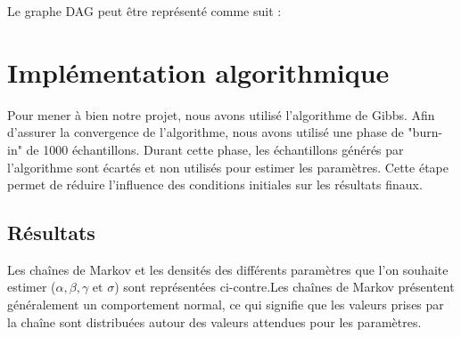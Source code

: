 \documentclass{rapportECN}
\begin{document}
Le graphe DAG peut être représenté comme suit : 
\begin{center}

\end{center}

\section*{Implémentation algorithmique}

 Pour mener à bien notre projet, nous avons utilisé l'algorithme de Gibbs. Afin d'assurer la convergence de l'algorithme, nous avons utilisé une phase de "burn-in" de 1000 échantillons. Durant cette phase, les échantillons générés par l'algorithme sont écartés et non utilisés pour estimer les paramètres. Cette étape permet de réduire l'influence des conditions initiales sur les résultats finaux.

 \subsection*{Résultats}

Les chaînes de Markov et les densités des différents paramètres que l'on souhaite estimer ($\alpha , \beta ,\gamma  \text{ et } \sigma$) sont représentées ci-contre.Les chaînes de Markov présentent généralement un comportement normal, ce qui signifie que les valeurs prises par la chaîne sont distribuées autour des valeurs attendues pour les paramètres.
\end{document}
